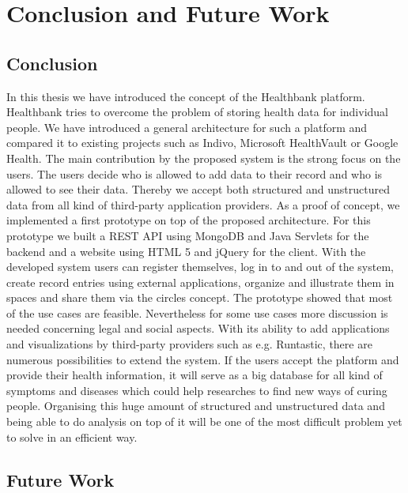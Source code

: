 	
\chapter{Conclusion and Future Work} 
\label{chap:conclusion}
 
\section{Conclusion}
In this thesis we have introduced the concept of the Healthbank platform. Healthbank tries to overcome the problem of storing health data for individual people. We have introduced a general architecture for such a platform and compared it to existing projects such as Indivo, Microsoft HealthVault or Google Health. The main contribution by the proposed system is the strong focus on the users. The users decide who is allowed to add data to their record and who is allowed to see their data. Thereby we accept both structured and unstructured data from all kind of third-party application providers. As a proof of concept, we implemented a first prototype on top of the proposed architecture. For this prototype we built a REST API using MongoDB and Java Servlets for the backend and a website using HTML 5 and jQuery for the client. With the developed system users can register themselves, log in to and out of the system, create record entries using external applications, organize and illustrate them in spaces and share them via the circles concept.  The prototype showed that most of the use cases are feasible. Nevertheless for some use cases more discussion is needed concerning legal and social aspects. With its ability to add applications and visualizations by third-party providers such as e.g. Runtastic, there are numerous possibilities to extend the system. If the users accept the platform and provide their health information, it will serve as a big database for all kind of symptoms and diseases which could help researches to find new ways of curing people. Organising this huge amount of structured and unstructured data and being able to do analysis on top of it will be one of the most difficult problem yet to solve in an efficient way.\newline


\section{Future Work}

